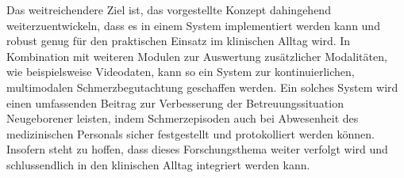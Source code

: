 Das weitreichendere Ziel ist, das vorgestellte Konzept dahingehend weiterzuentwickeln, dass es in einem System implementiert werden kann und robust genug für den praktischen Einsatz im klinischen Alltag wird. In Kombination mit weiteren Modulen zur Auswertung zusätzlicher Modalitäten, wie beispielsweise Videodaten, kann so ein System zur kontinuierlichen, multimodalen Schmerzbegutachtung geschaffen werden. Ein solches System wird einen umfassenden Beitrag zur Verbesserung der Betreuungssituation Neugeborener leisten, indem Schmerzepisoden auch bei Abwesenheit des medizinischen Personals sicher festgestellt und protokolliert werden können. Insofern steht zu hoffen, dass dieses Forschungsthema weiter verfolgt wird und schlussendlich in den klinischen Alltag integriert werden kann.





